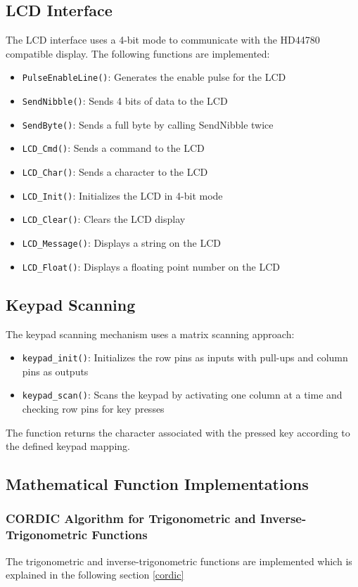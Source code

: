 \documentclass[12pt]{article}
\begin{document}
\subsection{LCD Interface}
The LCD interface uses a 4-bit mode to communicate with the HD44780 compatible display. The following functions are implemented:
\begin{itemize}
\item \texttt{PulseEnableLine()}: Generates the enable pulse for the LCD
\item \texttt{SendNibble()}: Sends 4 bits of data to the LCD
\item \texttt{SendByte()}: Sends a full byte by calling SendNibble twice
\item \texttt{LCD\_Cmd()}: Sends a command to the LCD
\item \texttt{LCD\_Char()}: Sends a character to the LCD
\item \texttt{LCD\_Init()}: Initializes the LCD in 4-bit mode
\item \texttt{LCD\_Clear()}: Clears the LCD display
\item \texttt{LCD\_Message()}: Displays a string on the LCD
\item \texttt{LCD\_Float()}: Displays a floating point number on the LCD
\end{itemize}
\subsection{Keypad Scanning}
The keypad scanning mechanism uses a matrix scanning approach:
\begin{itemize}
\item \texttt{keypad\_init()}: Initializes the row pins as inputs with pull-ups and column pins as outputs
\item \texttt{keypad\_scan()}: Scans the keypad by activating one column at a time and checking row pins for key presses
\end{itemize}
The function returns the character associated with the pressed key according to the defined keypad mapping.
\subsection{Mathematical Function Implementations}
\subsubsection{CORDIC Algorithm for Trigonometric and Inverse-Trigonometric Functions}
The trigonometric and inverse-trigonometric functions are implemented which is explained in the following section \ref{cordic}
\end{document}
